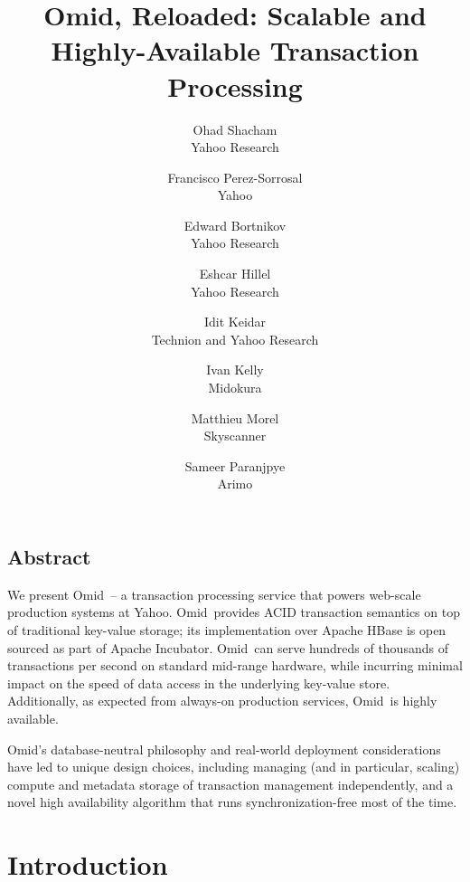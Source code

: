 \documentclass[letterpaper,twocolumn,10pt]{article}
\newcommand{\sys}{Omid}
\begin{document}
\date{}

\title{\Large \bf \sys, Reloaded: Scalable and Highly-Available Transaction Processing}

\author{
{\rm Ohad Shacham}\\
	Yahoo Research
	\and	
\and
{\rm Francisco Perez-Sorrosal}\\
	Yahoo
\and
{\rm Edward Bortnikov}\\
	Yahoo Research
	\and
{\rm Eshcar Hillel}\\
	Yahoo Research
	\and
{\rm Idit Keidar}\\
	Technion and Yahoo Research
	\and
{\rm Ivan Kelly}\\
	Midokura
\and
{\rm Matthieu Morel}\\
	Skyscanner
\and
{\rm Sameer Paranjpye}\\
	Arimo
} %


\maketitle

\subsection*{Abstract}

We present \sys\ -- a transaction processing service that powers web-scale 
production systems at Yahoo. \sys\ provides ACID transaction semantics on top of traditional 
key-value storage; its implementation over Apache HBase is open sourced as part of Apache Incubator. 
\sys\ can
serve hundreds of thousands of transactions per second
on standard mid-range hardware, while incurring minimal impact 
on the speed of  data access  in the underlying key-value store. 
Additionally, as expected from always-on production services, \sys\ is highly available. 

\sys's database-neutral philosophy and real-world deployment considerations have
led to unique design choices, including 
managing (and in particular, scaling) compute and metadata storage of transaction management independently,
and a novel high availability algorithm that runs  synchronization-free most of the time.


\section{Introduction}
\label{sec:intro}

\end{document}
